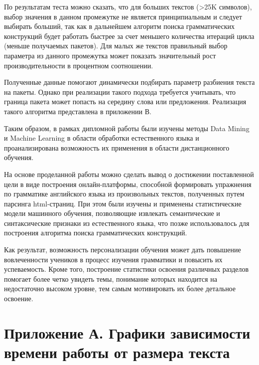 По результатам теста можно сказать, что для больших текстов (>25K символов), выбор значения в данном промежутке не является принципиальным и следует выбирать больший, так как в дальнейшем алгоритм поиска грамматических конструкций будет работать быстрее за счет меньшего количества итераций цикла (меньше получаемых пакетов). Для малых же текстов правильный выбор параметра из данного промежутка может показать значительный рост производительности в процентном соотношении. 

Полученные данные помогают динамически подбирать параметр разбиения текста на пакеты. Однако при реализации такого подхода требуется учитывать, что граница пакета может попасть на середину слова или предложения. Реализация такого алгоритма представлена в приложении В.



\newpage
\Conc
Таким образом, в рамках дипломной работы были изучены методы Data Mining и Machine Learning в области обработки естественного языка и проанализирована возможность их применения в области дистанционного обучения.

На основе проделанной работы можно сделать вывод о достижении поставленной цели в виде построения онлайн-платформы, способной формировать упражнения по грамматике английского языка из произвольных текстов, полученных путем парсинга html-страниц. При этом были изучены и применены статистические модели машинного обучения, позволяющие извлекать семантические и синтаксические признаки из естественного языка, что позже использовалось для построения алгоритма поиска грамматических конструкций. 

Как результат, возможность персонализации обучения может дать повышение вовлеченности учеников в процесс изучения грамматики и повысить их успеваемость. Кроме того, построение статистики освоения различных разделов помогает более четко увидеть темы, понимание которых находится на недостаточно высоком уровне, тем самым мотивировать их более детальное освоение.

\newpage

\printbibliography[%
    heading=bibintoc%
]

\newpage
\section*{Приложение А. Графики зависимости времени работы от размера текста}
\label{sec:len}

